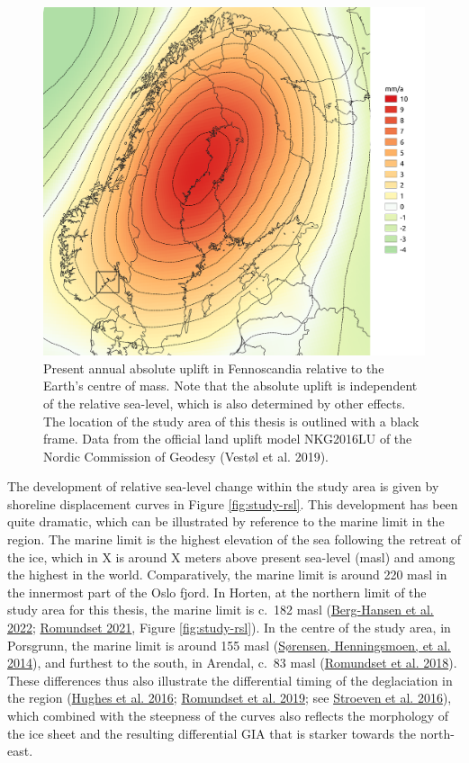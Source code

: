 \documentclass[
  12pt,
  a4paper,
  oneside]{book}
\begin{document}
\begin{figure}

{\centering \includegraphics[width=0.95\linewidth]{figures/present_uplift} 

}

\caption{Present annual absolute uplift in Fennoscandia relative to the Earth's centre of mass. Note that the absolute uplift is independent of the relative sea-level, which is also determined by other effects. The location of the study area of this thesis is outlined with a black frame. Data from the official land uplift model NKG2016LU of the Nordic Commission of Geodesy (Vestøl et al. 2019).}\label{fig:uplift}
\end{figure}

The development of relative sea-level change within the study area is given by shoreline displacement curves in Figure \ref{fig:study-rsl}. This development has been quite dramatic, which can be illustrated by reference to the marine limit in the region. The marine limit is the highest elevation of the sea following the retreat of the ice, which in X is around X meters above present sea-level (masl) and among the highest in the world. Comparatively, the marine limit is around 220 masl in the innermost part of the Oslo fjord. In Horten, at the northern limit of the study area for this thesis, the marine limit is c.~182 masl (\protect\hyperlink{ref-berg-hansen2022}{Berg-Hansen et al. 2022}; \protect\hyperlink{ref-romundset2021}{Romundset 2021}, Figure \ref{fig:study-rsl}). In the centre of the study area, in Porsgrunn, the marine limit is around 155 masl (\protect\hyperlink{ref-suxf8rensen2014}{Sørensen, Henningsmoen, et al. 2014}), and furthest to the south, in Arendal, c.~83 masl (\protect\hyperlink{ref-romundset2018}{Romundset et al. 2018}). These differences thus also illustrate the differential timing of the deglaciation in the region (\protect\hyperlink{ref-hughes2016}{Hughes et al. 2016}; \protect\hyperlink{ref-romundset2019}{Romundset et al. 2019}; see \protect\hyperlink{ref-stroeven2016}{Stroeven et al. 2016}), which combined with the steepness of the curves also reflects the morphology of the ice sheet and the resulting differential GIA that is starker towards the north-east.
\end{document}
